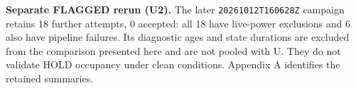 \textbf{Separate FLAGGED rerun (U2).} The later \texttt{20261012T160628Z} campaign retains 18 further attempts, 0 accepted: all 18 have live-power exclusions and 6 also have pipeline failures. Its diagnostic ages and state durations are excluded from the comparison presented here and are not pooled with U. They do not validate HOLD occupancy under clean conditions. Appendix A identifies the retained summaries.
